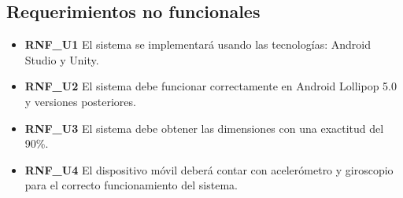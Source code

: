 \subsection{Requerimientos no funcionales}

\begin{itemize}
\item \textbf{RNF\_U1} El sistema se implementará usando las tecnologías: Android Studio y Unity.
\item \textbf{RNF\_U2} El sistema debe funcionar correctamente en Android Lollipop 5.0 y versiones posteriores.
\item \textbf{RNF\_U3} El sistema debe obtener las dimensiones con una exactitud del 90\%.
\item \textbf{RNF\_U4} El dispositivo móvil deberá contar con acelerómetro y giroscopio para el correcto funcionamiento del sistema.

\end{itemize}